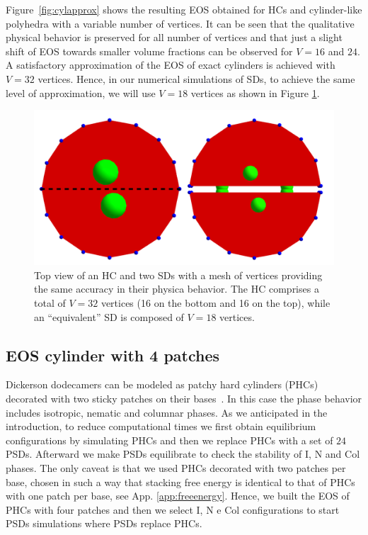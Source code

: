 \documentclass[aip,jcp, amsmath, amssymb, reprint]{revtex4-1}
\begin{document}
Figure~\ref{fig:cylapprox} shows the resulting EOS obtained for HCs and cylinder-like polyhedra
 with a variable number of vertices. It can be seen that the qualitative physical behavior is preserved for
all number of vertices and that just a slight shift of EOS towards smaller volume fractions can be observed for $V= 16$ and $24$. A satisfactory approximation of the EOS of exact cylinders is achieved with $V=32$ 
vertices. 
Hence, in our numerical simulations of SDs, to achieve the same level of approximation, we will use $V=18$ vertices as shown in Figure \ref{fig:cutcyl}.
\begin{figure}[h!] \includegraphics[width=0.7\linewidth]{taglio.png}
  \caption{\label{fig:cutcyl} Top view of an HC and two SDs with a mesh of vertices providing the same
  accuracy in their physica behavior. The HC comprises a total of $V=32$ vertices (16 on the bottom and 16 on the top), while an ``equivalent'' SD is composed of $V=18$ vertices.}
\end{figure}

\subsection{EOS cylinder with 4 patches}
Dickerson dodecamers can be modeled as patchy hard cylinders (PHCs) decorated with two sticky patches on their 
bases~\cite{DeMichele12}. In this case the phase behavior includes isotropic, nematic and columnar phases.
As we anticipated in the introduction, to reduce computational times we first obtain equilibrium configurations
by simulating PHCs and then we replace PHCs with a set of $24$ PSDs. Afterward we make PSDs equilibrate to check the stability
of I, N and Col phases. The only caveat is that we used PHCs decorated with two patches per base, chosen in such a way 
that stacking free energy is identical to that of PHCs with one patch per base, see App. \ref{app:freeenergy}. 
Hence, we built the EOS of PHCs with four patches and then we select I, N e Col configurations to start PSDs simulations
where PSDs replace PHCs.
\end{document}
